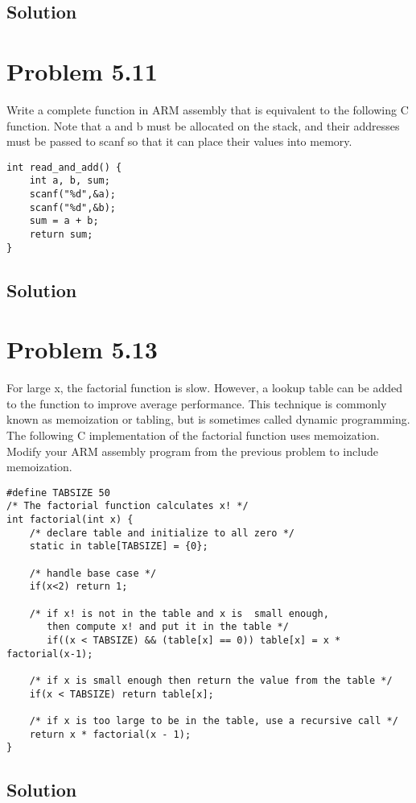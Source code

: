 \documentclass[letterpaper,11pt]{texMemo} %
\begin{document}
\subsection*{Solution}


\section*{Problem 5.11}
Write a complete function in ARM assembly that is equivalent to the following C function.
Note that a and b must be allocated on the stack, and their addresses must be passed to
scanf so that it can place their values into memory.
\begin{lstlisting}
int read_and_add() {
    int a, b, sum;
    scanf("%d",&a);
    scanf("%d",&b);
    sum = a + b;
    return sum;
}
\end{lstlisting}
\subsection*{Solution}


\section*{Problem 5.13}
For large x, the factorial function is slow. However, a lookup table can be added to the
function to improve average performance. This technique is commonly known as memoization
or tabling, but is sometimes called dynamic programming. The following C implementation
of the factorial function uses memoization. Modify your ARM assembly program from the
previous problem to include memoization.
\begin{lstlisting}
#define TABSIZE 50
/* The factorial function calculates x! */
int factorial(int x) {
    /* declare table and initialize to all zero */
    static in table[TABSIZE] = {0};

    /* handle base case */
    if(x<2) return 1;

    /* if x! is not in the table and x is  small enough,
       then compute x! and put it in the table */
       if((x < TABSIZE) && (table[x] == 0)) table[x] = x * factorial(x-1);

    /* if x is small enough then return the value from the table */
    if(x < TABSIZE) return table[x];

    /* if x is too large to be in the table, use a recursive call */
    return x * factorial(x - 1);
}
\end{lstlisting}
\subsection*{Solution}

\end{document}
